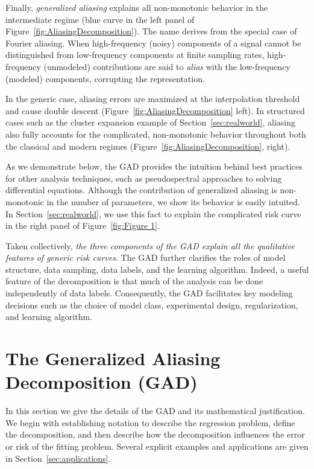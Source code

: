 \documentclass[twocolumn,aps,prx,superscriptaddress,10pt]{revtex4-2}
\newcommand{\0}{\bm{0}}
\begin{document}
Finally, \emph{generalized aliasing} explains all non-monotonic behavior in the intermediate regime (blue curve in the left panel of Figure~\ref{fig:AliasingDecomposition}).
The name derives from the special case of Fourier aliasing.  
When high-frequency (noisy) components of a signal cannot be distinguished from low-frequency components at finite sampling rates,  high-frequency (unmodeled) contributions are said to \emph{alias} with the low-frequency (modeled) components, corrupting the representation.

In the generic case, aliasing errors are maximized at the interpolation threshold and cause double descent (Figure~\ref{fig:AliasingDecomposition} left).
In structured cases such as the cluster expansion example of Section~\ref{sec:realworld}, aliasing also fully accounts for the complicated, non-monotonic behavior throughout both the classical and modern regimes (Figure~\ref{fig:AliasingDecomposition}, right).


As we demonstrate below, the GAD provides the intuition behind best practices for other analysis techniques, such as pseudospectral approaches to solving differential equations.
Although the contribution of generalized aliasing is non-monotonic in the number of parameters, we show its behavior is easily intuited.
In Section~\ref{sec:realworld}, we use this fact to explain the complicated risk curve in the right panel of Figure~\ref{fig:Figure 1}.


Taken collectively, \emph{the three components of the GAD explain all the qualitative features of generic risk curves}.
The GAD further clarifies the roles of model structure, data sampling, data labels, and the learning algorithm.  
Indeed, a useful feature of the decomposition is that much of the analysis can be done independently of data labels. 
Consequently, the GAD facilitates key modeling decisions such as the choice of model class, experimental design, regularization, and learning algorithm.


\section{The Generalized Aliasing Decomposition (GAD)}
\label{sec:derivation}

In this section we give the details of the GAD and its mathematical justification.  
We begin with establishing notation to describe the regression problem, define the decomposition, and then describe how the decomposition influences the error or risk of the fitting problem.  Several explicit examples and applications are given in Section~\ref{sec:applications}.
\end{document}
